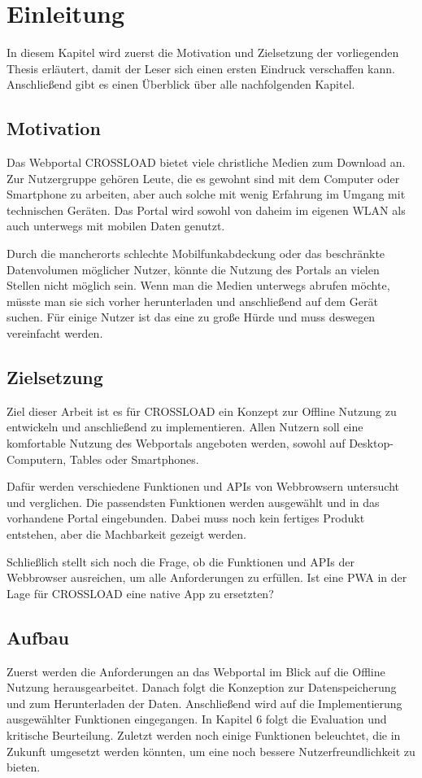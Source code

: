 \chapter{Einleitung}
\label{Kap1}

In diesem Kapitel wird zuerst die Motivation und Zielsetzung der vorliegenden Thesis erläutert, damit der Leser sich einen ersten Eindruck verschaffen kann. Anschließend gibt es einen Überblick über alle nachfolgenden Kapitel.


\section{Motivation}
Das Webportal CROSSLOAD bietet viele christliche Medien zum Download an. Zur Nutzergruppe gehören Leute, die es gewohnt sind mit dem Computer oder Smartphone zu arbeiten, aber auch solche mit wenig Erfahrung im Umgang mit technischen Geräten. Das Portal wird sowohl von daheim im eigenen WLAN als auch unterwegs mit mobilen Daten genutzt.

Durch die mancherorts schlechte Mobilfunkabdeckung oder das beschränkte
Datenvolumen möglicher Nutzer, könnte die Nutzung des Portals an vielen Stellen nicht
möglich sein. Wenn man die Medien unterwegs abrufen möchte, müsste man sie sich
vorher herunterladen und anschließend auf dem Gerät suchen. Für einige Nutzer ist das
eine zu große Hürde und muss deswegen vereinfacht werden. 

\section{Zielsetzung}
Ziel dieser Arbeit ist es für CROSSLOAD ein Konzept zur Offline Nutzung zu entwickeln und anschließend zu implementieren. Allen Nutzern soll eine komfortable Nutzung des Webportals angeboten werden, sowohl auf Desktop-Computern, Tables oder Smartphones. 

Dafür werden verschiedene Funktionen und \acp{API} von Webbrowsern untersucht und verglichen. Die passendsten Funktionen werden ausgewählt und in das vorhandene Portal eingebunden. Dabei muss noch kein fertiges Produkt entstehen, aber die Machbarkeit gezeigt werden. 

Schließlich stellt sich noch die Frage, ob die Funktionen und APIs der Webbrowser ausreichen, um alle Anforderungen zu erfüllen. Ist eine \ac{PWA} in der Lage für CROSSLOAD eine native App zu ersetzten?

\section{Aufbau}
Zuerst werden die Anforderungen an das Webportal im Blick auf die Offline Nutzung herausgearbeitet. Danach folgt die Konzeption zur Datenspeicherung und zum Herunterladen der Daten. Anschließend wird auf die Implementierung ausgewählter Funktionen eingegangen. In Kapitel 6 folgt die Evaluation und kritische Beurteilung. Zuletzt werden noch einige Funktionen beleuchtet, die in Zukunft umgesetzt werden könnten, um eine noch bessere Nutzerfreundlichkeit zu bieten.
